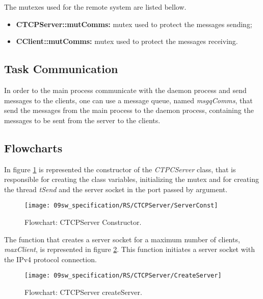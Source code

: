 
The mutexes used for the remote system are listed bellow.

\begin{itemize}
	\item \textbf{CTCPServer::mutComms:} mutex used to protect the messages sending;
	\item \textbf{CClient::mutComms:} mutex used to protect the messages receiving.
\end{itemize}

\subsection{Task Communication}

In order to the main process communicate with the daemon process and send messages to the clients, one can use a message queue, named \textit{msgqComms}, that send the messages from the main process to the daemon process, containing the messages to be sent from the server to the clients.

\subsection{Flowcharts}

In figure \ref{fig:ServerConst} is represented the constructor of the \textit{CTPCServer} class, that is responsible for creating the class variables, initializing the mutex and for creating the thread \textit{tSend} and the server socket in the port passed by argument.

\begin{figure}[H]
	\centering
	\texttt{[image: 09sw\_specification/RS/CTCPServer/ServerConst]}
	\caption{Flowchart: CTCPServer Constructor.}
	\label{fig:ServerConst}
\end{figure}

The function that creates a server socket for a maximum number of clients, \textit{maxClient}, is represented in figure \ref{fig:RSCreateServer}. This function initiates a server socket with the IPv4 protocol connection.

\begin{figure}[H]
	\centering
	\texttt{[image: 09sw\_specification/RS/CTCPServer/CreateServer]}
	\caption{Flowchart: CTCPServer createServer.}
	\label{fig:RSCreateServer}
\end{figure}

